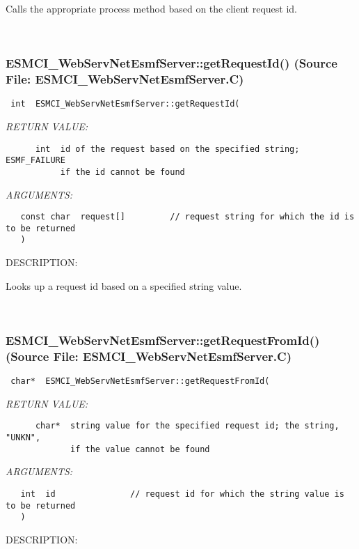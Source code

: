       Calls the appropriate process method based on the client request id.
   
 
\mbox{}\hrulefill\
 
\subsubsection{ESMCI\_WebServNetEsmfServer::getRequestId() (Source File: ESMCI\_WebServNetEsmfServer.C)}


  
\begin{verbatim} int  ESMCI_WebServNetEsmfServer::getRequestId(\end{verbatim}{\em RETURN VALUE:}
\begin{verbatim}      int  id of the request based on the specified string; ESMF_FAILURE
           if the id cannot be found\end{verbatim}{\em ARGUMENTS:}
\begin{verbatim}   const char  request[]         // request string for which the id is to be returned
   )\end{verbatim}
{\sf DESCRIPTION:\\ }


      Looks up a request id based on a specified string value.
   
 
\mbox{}\hrulefill\
 
\subsubsection{ESMCI\_WebServNetEsmfServer::getRequestFromId() (Source File: ESMCI\_WebServNetEsmfServer.C)}


  
\begin{verbatim} char*  ESMCI_WebServNetEsmfServer::getRequestFromId(\end{verbatim}{\em RETURN VALUE:}
\begin{verbatim}      char*  string value for the specified request id; the string, "UNKN",
             if the value cannot be found\end{verbatim}{\em ARGUMENTS:}
\begin{verbatim}   int  id               // request id for which the string value is to be returned
   )\end{verbatim}
{\sf DESCRIPTION:\\ }



